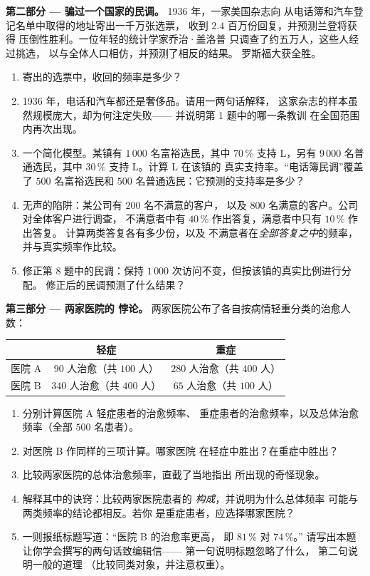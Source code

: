 \begin{problem}
\medskip
\noindent\textbf{第二部分 --- 骗过一个国家的民调。}
1936 年，一家美国杂志向
从电话簿和汽车登记名单中取得的地址寄出一千万张选票，
收到 $2.4$ 百万份回复，并预测兰登将获得
压倒性胜利。一位年轻的统计学家乔治·盖洛普
只调查了约五万人，这些人经过挑选，
以与全体人口相仿，并预测了相反的结果。
罗斯福大获全胜。
\begin{enumerate}[resume]
  \item 寄出的选票中，收回的频率是多少？
  \item 1936 年，电话和汽车都还是奢侈品。请用一两句话解释，
        这家杂志的样本虽然规模庞大，却为何注定失败——
        并说明第 1 题中的哪一条教训
        在全国范围内再次出现。
  \item 一个简化模型。某镇有 $1\,000$ 名富裕选民，其中
        $70\,\%$ 支持 L，另有 $9\,000$ 名普通选民，其中
        $30\,\%$ 支持 L。计算 L 在该镇的
        真实支持率。“电话簿民调”覆盖了 $500$ 名富裕选民和
        $500$ 名普通选民：它预测的支持率是多少？
  \item 无声的陷阱：某公司有 $200$ 名不满意的客户，
        以及 $800$ 名满意的客户。公司对全体客户进行调查，
        不满意者中有 $40\,\%$ 作出答复，满意者中只有 $10\,\%$ 作出答复。
        计算两类答复各有多少份，以及
        不满意者在\emph{全部答复之中}的频率，
        并与真实频率作比较。
  \item 修正第 8 题中的民调：保持 $1\,000$
        次访问不变，但按该镇的真实比例进行分配。
        修正后的民调预测了什么结果？
\end{enumerate}

\medskip
\noindent\textbf{第三部分 --- 两家医院的
悖论。}
两家医院公布了各自按病情轻重分类的治愈人数：
\begin{center}
\renewcommand{\arraystretch}{1.3}
\begin{tabular}{l|cc}
 & 轻症 & 重症 \\
\hline
医院 A & $90$ 人治愈（共 $100$ 人）& $280$ 人治愈（共 $400$ 人）\\
医院 B & $340$ 人治愈（共 $400$ 人）& $65$ 人治愈（共 $100$ 人）\\
\end{tabular}
\end{center}
\begin{enumerate}[resume]
  \item 分别计算医院 A 轻症患者的治愈频率、
        重症患者的治愈频率，以及总体治愈频率（全部 $500$ 名患者）。
  \item 对医院 B 作同样的三项计算。哪家医院
        在轻症中胜出？在重症中胜出？
  \item 比较两家医院的总体治愈频率，直截了当地指出
        所出现的奇怪现象。
  \item 解释其中的诀窍：比较两家医院患者的
        \emph{构成}，并说明为什么总体频率
        可能与两类频率的结论都相反。若你
        是重症患者，应选择哪家医院？
  \item 一则报纸标题写道：“医院 B 的治愈率更高，
        即 $81\,\%$ 对 $74\,\%$。”
        请写出本题让你学会撰写的两句话致编辑信——
        第一句说明标题忽略了什么，
        第二句说明一般的道理
        （比较同类对象，并注意权重）。
\end{enumerate}
\end{problem}
